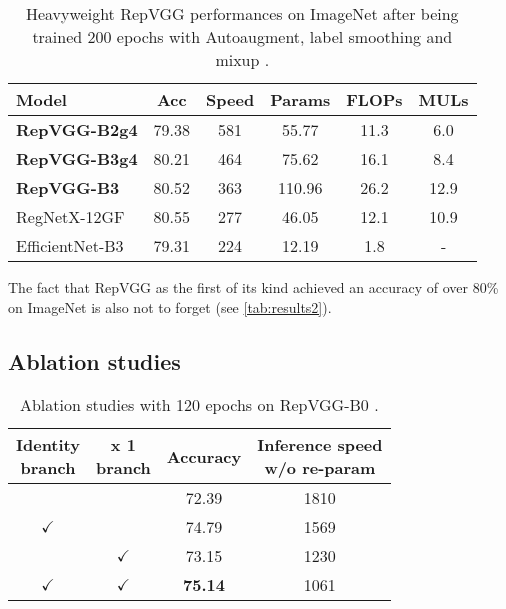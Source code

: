 \setlength{\tabcolsep}{3pt}
\begin{table}
	\begin{center}
		\begin{tabular}{lccccc} 
			\hline
			Model & Acc & Speed & Params & FLOPs & MULs \\
			\hline
			\textbf{RepVGG-B2g4} & 79.38 & 581 & 55.77 & 11.3 & 6.0 \\
			\textbf{RepVGG-B3g4} & 80.21 & 464 & 75.62 & 16.1 & 8.4 \\
			\textbf{RepVGG-B3} & 80.52 & 363 & 110.96 & 26.2 & 12.9 \\
			RegNetX-12GF & 80.55 & 277 & 46.05 & 12.1 & 10.9 \\
			EfficientNet-B3 & 79.31 & 224 & 12.19 & 1.8 & - \\
			\hline
		\end{tabular}
	\end{center}
	\caption{Heavyweight RepVGG performances on ImageNet \cite{JiaDeng.2009} after being trained 200 epochs with Autoaugment, label smoothing and mixup \cite{XiaohanDing.2021}.}
	\label{tab:results2}
\end{table}
\setlength{\tabcolsep}{6pt}

The fact that RepVGG as the first of its kind achieved an accuracy of over 80\% on ImageNet \cite{JiaDeng.2009} is also not to forget (see \autoref{tab:results2}).

\subsection{Ablation studies}

\begin{table}
	\begin{center}
		\begin{tabular}{cccc} 
			\hline
			\parbox[c][1cm]{1cm}{\centering Identity\\branch} & \parbox[c][1cm]{1cm}{ x 1\\branch} & \parbox[c][1cm]{1cm}{\centering Accuracy} & \parbox[c][1cm]{3cm}{\centering Inference speed\\w/o re-param} \\
			\hline
			 & & 72.39 & 1810 \\
			$\checkmark$ & & 74.79 & 1569 \\
			 & $\checkmark$ & 73.15 & 1230 \\
			$\checkmark$ & $\checkmark$ & \textbf{75.14} & 1061 \\
			\hline
		\end{tabular}
	\end{center}
	\caption{Ablation studies with 120 epochs on RepVGG-B0 \cite{XiaohanDing.2021}.}
	\label{tab:ablation1}
\end{table}

